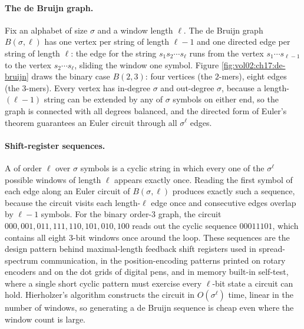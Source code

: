 \paragraph{The de Bruijn graph.}
Fix an alphabet of size $\sigma$ and a window length $\ell$. The de
Bruijn graph $B(\sigma, \ell)$ has one vertex per string of length
$\ell - 1$ and one directed edge per string of length $\ell$: the
edge for the string $s_{1} s_{2} \cdots s_{\ell}$ runs from the
vertex $s_{1} \cdots s_{\ell-1}$ to the vertex $s_{2} \cdots
s_{\ell}$, sliding the window one symbol. Figure
\ref{fig:vol02:ch17:de-bruijn} draws the binary case $B(2, 3)$: four
vertices (the $2$-mers), eight edges (the $3$-mers). Every vertex has
in-degree $\sigma$ and out-degree $\sigma$, because a length-$(\ell-1)$
string can be extended by any of $\sigma$ symbols on either end, so
the graph is connected with all degrees balanced, and the directed
form of Euler's theorem guarantees an Euler circuit through all
$\sigma^{\ell}$ edges.



\paragraph{Shift-register sequences.}
A  of order $\ell$ over $\sigma$ symbols
is a cyclic string in which every one of the $\sigma^{\ell}$ possible
windows of length $\ell$ appears exactly once. Reading the first
symbol of each edge along an Euler circuit of $B(\sigma, \ell)$
produces exactly such a sequence, because the circuit visits each
length-$\ell$ edge once and consecutive edges overlap by $\ell - 1$
symbols. For the binary order-$3$ graph, the circuit
$000, 001, 011, 111, 110, 101, 010, 100$ reads out the cyclic
sequence $00011101$, which contains all eight $3$-bit windows once
around the loop. These sequences are the design pattern behind
maximal-length feedback shift registers used in spread-spectrum
communication, in the position-encoding patterns printed on rotary
encoders and on the dot grids of digital pens, and in memory
built-in self-test, where a single short cyclic pattern must exercise
every $\ell$-bit state a circuit can hold. Hierholzer's algorithm
constructs the circuit in $O(\sigma^{\ell})$ time, linear in the
number of windows, so generating a de Bruijn sequence is cheap even
where the window count is large.

